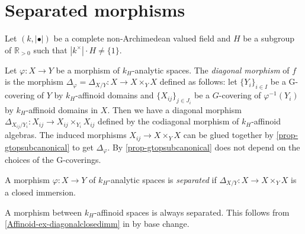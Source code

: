 \section{Separated morphisms}
Let $(k,|\bullet|)$ be a complete non-Archimedean valued field and $H$ be a subgroup of $\mathbb{R}_{>0}$ such that $|k^{\times}|\cdot H\neq \{1\}$.

\begin{definition}\label{def-diagmorphism}
    Let $\varphi:X\rightarrow Y$ be a morphism of $k_H$-analytic spaces. The \emph{diagonal morphism} of $f$ is the morphism $\Delta_{\varphi}=\Delta_{X/Y}:X\rightarrow X\times_Y X$ defined as follows: let $\{Y_i\}_{i\in I}$ be a G-covering of $Y$ by $k_H$-affinoid domains and $\{X_{ij}\}_{j\in J_i}$ be a $G$-covering of $\varphi^{-1}(Y_i)$ by $k_H$-affinoid domains in $X$.
    Then we have a diagonal morphism $\Delta_{X_{ij}/Y_i}:X_{ij}\rightarrow X_{ij}\times_{Y_i} X_{ij}$ defined by the codiagonal morphism of $k_H$-affinoid algebras. The induced morphisms $X_{ij}\rightarrow X\times_Y X$ can be glued together by \cref{prop-gtopsubcanonical} to get $\Delta_{\varphi}$. By \cref{prop-gtopsubcanonical} does not depend on the choices of the G-coverings. 
\end{definition}

\begin{definition}
    A morphism $\varphi:X\rightarrow Y$ of $k_H$-analytic spaces is \emph{separated} if $\Delta_{X/Y}:X\rightarrow X\times_Y X$ is a closed immersion.
\end{definition}

\begin{example}
    A morphism between $k_H$-affinoid spaces is always separated. This follows from \cref{Affinoid-ex-diagonalclosedimm} in  by base change.
\end{example}

